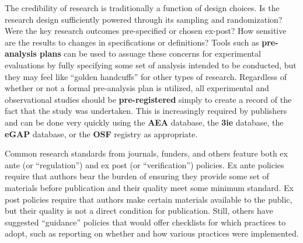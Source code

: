 The credibility of research is traditionally a function of design choices.\cite{angrist2010credibility,ioannidis2005most}
Is the research design sufficiently powered through its sampling and randomization?
Were the key research outcomes pre-specified or chosen ex-post?
How sensitive are the results to changes in specifications or definitions?
Tools such as \textbf{pre-analysis plans}
can be used to assuage these concerns for experimental evaluations
by fully specifying some set of analysis intended to be conducted,
but they may feel like ``golden handcuffs'' for other types of research.\cite{olken2015promises}
Regardless of whether or not a formal pre-analysis plan is utilized,
all experimental and observational studies should be \textbf{pre-registered}
simply to create a record of the fact that the study was undertaken.
This is increasingly required by publishers and can be done very quickly
using the \textbf{AEA} database,
the \textbf{3ie} database,
the \textbf{eGAP} database,
or the \textbf{OSF} registry as appropriate.

Common research standards from journals, funders, and others feature both ex
ante
(or ``regulation'') and ex post (or ``verification'') policies.\cite{stodden2013toward}
Ex ante policies require that authors bear the burden
of ensuring they provide some set of materials before publication
and their quality meet some minimum standard.
Ex post policies require that authors make certain materials available to the public,
but their quality is not a direct condition for publication.
Still, others have suggested ``guidance'' policies that would offer checklists
for which practices to adopt, such as reporting on whether and how
various practices were implemented.\cite{nosek2015promoting}

